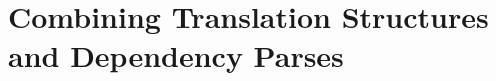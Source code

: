 \documentclass{report}
\newcommand\textcyr[1]{{\fontencoding{OT2}\fontfamily{wncyr}\selectfont #1}}
\theoremstyle{definition}
\theoremstyle{plain}
\begin{document}
%
%
%
%
%
%


\section{Combining Translation Structures and Dependency Parses}
\end{document}
